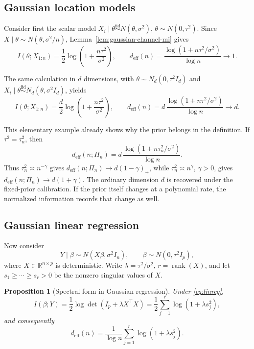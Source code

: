\documentclass[11pt]{article}
\theoremstyle{plain}
\newtheorem{proposition}{Proposition}
\theoremstyle{definition}
\theoremstyle{remark}
\begin{document}
\subsection{Gaussian location models}
\label{subsec:location}

Consider first the scalar model \(X_i\mid\theta\stackrel{\mathrm{iid}}{\sim}N(\theta,\sigma^2)\), \(\theta\sim N(0,\tau^2)\). Since \(\bar X\mid\theta\sim N(\theta,\sigma^2/n)\), Lemma~\ref{lem:gaussian-channel-mi} gives
\[
I(\theta;X_{1:n})=\frac12\log\left(1+\frac{n\tau^2}{\sigma^2}\right),
\qquad
d_{\mathrm{eff}}(n)=\frac{\log(1+n\tau^2/\sigma^2)}{\log n}\to1.
\]

The same calculation in \(d\) dimensions, with \(\theta\sim N_d(0,\tau^2I_d)\) and \(X_i\mid\theta\stackrel{\mathrm{iid}}{\sim}N_d(\theta,\sigma^2I_d)\), yields
\[
I(\theta;X_{1:n})=\frac d2\log\left(1+\frac{n\tau^2}{\sigma^2}\right),
\qquad
d_{\mathrm{eff}}(n)
=
d\,\frac{\log(1+n\tau^2/\sigma^2)}{\log n}
\to d.
\]

This elementary example already shows why the prior belongs in the definition. If \(\tau^2=\tau_n^2\), then
\[
d_{\mathrm{eff}}(n;\Pi_n)
=
d\,\frac{\log(1+n\tau_n^2/\sigma^2)}{\log n}.
\]
Thus \(\tau_n^2\asymp n^{-\gamma}\) gives \(d_{\mathrm{eff}}(n;\Pi_n)\to d(1-\gamma)_+\), while \(\tau_n^2\asymp n^\gamma\), \(\gamma>0\), gives \(d_{\mathrm{eff}}(n;\Pi_n)\to d(1+\gamma)\). The ordinary dimension \(d\) is recovered under the fixed-prior calibration. If the prior itself changes at a polynomial rate, the normalized information records that change as well.

\subsection{Gaussian linear regression}
\label{subsec:linear-regression}

Now consider
\begin{equation}
	\label{eq:linreg}
	Y\mid\beta\sim N(X\beta,\sigma^2I_n),
	\qquad
	\beta\sim N(0,\tau^2I_p),
\end{equation}
where \(X\in\mathbb R^{n\times p}\) is deterministic. Write \(\lambda=\tau^2/\sigma^2\), \(r=\operatorname{rank}(X)\), and let \(s_1\ge\cdots\ge s_r>0\) be the nonzero singular values of \(X\).

\begin{proposition}[Spectral form in Gaussian regression]
	\label{prop:linreg-mi}
	Under \eqref{eq:linreg},
	\begin{equation*}
		I(\beta;Y)
		=
		\frac12\log\det(I_p+\lambda X^\top X)
		=
		\frac12\sum_{j=1}^r\log(1+\lambda s_j^2),
	\end{equation*}
	and consequently
	\begin{equation}
		\label{eq:linreg-deff}
		d_{\mathrm{eff}}(n)
		=
		\frac1{\log n}\sum_{j=1}^r\log(1+\lambda s_j^2).
	\end{equation}
\end{proposition}
\end{document}
